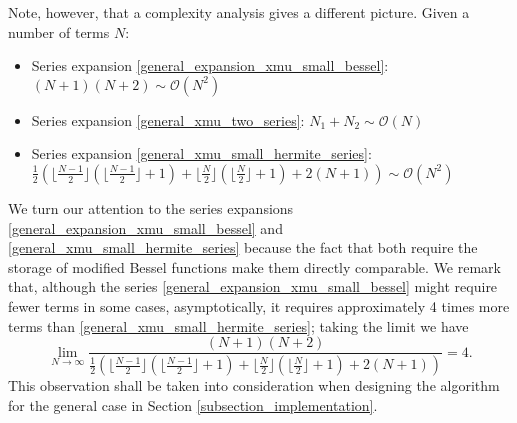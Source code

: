 \documentclass[10pt,a4paper,oneside]{article}
\numberwithin{equation}{section}
\begin{document}

\begin{table}[H]
	\centering
	\caption{Comparison on the number of terms to achieve machine precision with the three series expansions for $|x-\mu| \to 0$.}
	\label{table_xmu_general_n_terms}
\end{table}

Note, however, that a complexity analysis gives a different picture. Given a number of terms $N$:
\begin{itemize}
\item Series expansion \eqref{general_expansion_xmu_small_bessel}: $(N + 1) (N + 2) \sim \mathcal{O}(N^2)$
\item Series expansion \eqref{general_xmu_two_series}: $N_1 + N_2 \sim \mathcal{O}(N)$
\item Series expansion \eqref{general_xmu_small_hermite_series}: $\frac{1}{2}\left(\lfloor\frac{N - 1}{2} \rfloor \left(\lfloor\frac{N - 1}{2} \rfloor + 1\right) + \lfloor\frac{N}{2} \rfloor \left(\lfloor\frac{N}{2} \rfloor + 1\right) + 2 (N + 1)\right) \sim \mathcal{O}(N^2)$
\end{itemize}
We turn our attention to the series expansions \eqref{general_expansion_xmu_small_bessel} and \eqref{general_xmu_small_hermite_series} because the fact that both require the storage of modified Bessel functions make them directly comparable. We remark that, although the series \eqref{general_expansion_xmu_small_bessel} might require fewer terms in some cases, asymptotically, it requires approximately 4 times more terms than \eqref{general_xmu_small_hermite_series}; taking the limit we have
\begin{equation*}
\lim_{N\to\infty} \frac{(N + 1) (N + 2)}{\frac{1}{2}\left(\lfloor\frac{N - 1}{2} \rfloor \left(\lfloor\frac{N - 1}{2} \rfloor + 1\right) + \lfloor\frac{N}{2} \rfloor \left(\lfloor\frac{N}{2} \rfloor + 1\right) + 2 (N + 1)\right)} = 4.
\end{equation*}
This observation shall be taken into consideration when designing the algorithm for the general case in Section \ref{subsection_implementation}.
\end{document}
